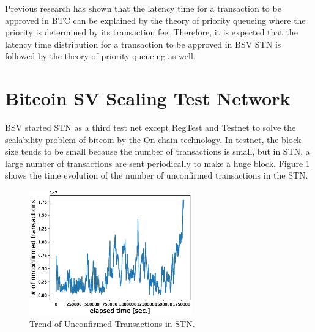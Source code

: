 \documentclass[graybox]{svmult}
\begin{document}
Previous research\cite{KK2019} has shown that the latency time for a transaction to be approved in BTC can be explained by the theory of priority queueing where the priority is determined by its transaction fee.
Therefore, it is expected that the latency time distribution for a transaction to be approved in BSV STN is followed by the theory of priority queueing as well. 



\section{Bitcoin SV Scaling Test Network}
\label{sec:stn}

BSV started STN as a third test net except RegTest and Testnet to solve the scalability problem of bitcoin by the On-chain technology.
In testnet, the block size tends to be small because the number of transactions is small, but in STN, a large number of transactions are sent periodically to make a huge block.
Figure \ref{fig:unconfirmed_tx} shows the time evolution of the number of unconfirmed transactions in the STN.
%
\begin{figure}[t]
  \vspace{-35mm}
  \begin{center}
    \includegraphics[width=70mm]{time_vs_tx-plot.eps}
  \end{center}
  \vspace{35mm}
  \caption{Trend of Unconfirmed Transactions in STN.}
  \label{fig:unconfirmed_tx}
\end{figure}
%
\end{document}
